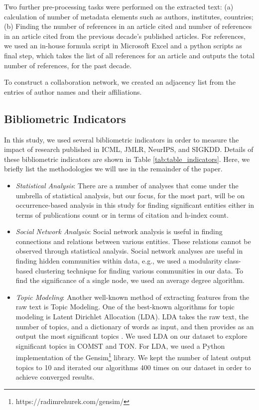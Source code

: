 Two further pre-processing tasks were performed on the extracted text: (a) calculation of number of metadata elements such as authors, institutes, countries; (b) Finding the number of references in an article cited and number of references in an article cited from the previous decade's published articles. For references, we used an in-house formula script in Microsoft Excel and a python scripts as final step, which takes the list of all references for an article and outputs the total number of references, for the past decade. 

To construct a collaboration network, we created an adjacency list from the entries of author names and their affiliations.


\subsection{Bibliometric Indicators}

In this study, we used several bibliometric indicators in order to measure the impact of research published in ICML, JMLR, NeurIPS, and SIGKDD. Details of these bibliometric indicators are shown in Table \ref{tab:table_indicators}. Here, we briefly list the methodologies we will use in the remainder of the paper. 


\begin{itemize}
	
	\item \textit{Statistical Analysis}: There are a number of analyses that come under the umbrella of statistical analysis, but our focus, for the most part, will be on occurrence-based analysis \citep{weatherburn1949first} in this study for finding significant entities either in terms of publications count or in terms of citation and h-index count. 
	
	\item \textit{Social Network Analysis}: Social network analysis is useful in finding connections and relations between various entities. These relations cannot be observed through statistical analysis. Social network analyses are useful in finding hidden communities within data, e.g., we used a modularity class-based clustering technique \citep{blondel2008fast} for finding various communities in our data. To find the significance of a single node, we used an average degree algorithm.
	
	\item \textit{Topic Modeling}: Another well-known method of extracting features from the raw text is Topic Modeling.  One of the best-known algorithms for topic modeling is Latent Dirichlet Allocation (LDA). LDA takes the raw text, the number of topics, and a dictionary of words as input, and then provides as an output the most significant topics \citep{blei2003latent}. We used LDA on our dataset to explore significant topics in COMST and TON. For LDA, we used a Python implementation of the Gensim\footnote{https://radimrehurek.com/gensim/} library. We kept the number of latent output topics to 10 and iterated our algorithms 400 times on our dataset in order to achieve converged results.    
\end{itemize}


